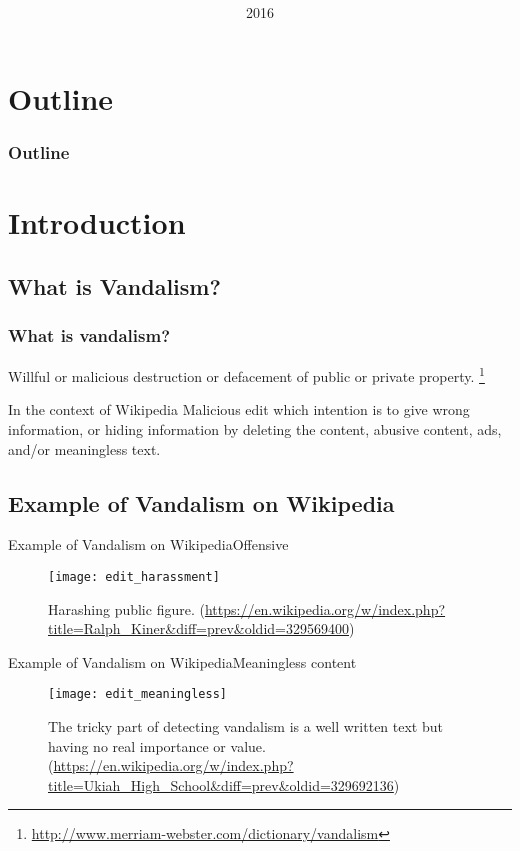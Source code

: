 \documentclass{beamer}
\title[Detecting Vandalism with CRF]{%
	\mytitle
}
\author{\myname}
\institute[STEI-ITB]{%
	\mydept\\
	\itb
}
\date{2016}
\begin{document}
\frame{\titlepage}

\section*{Outline}
\begin{frame}
	\frametitle{Outline}
	\begin{multicols}{2}
		\tableofcontents
	\end{multicols}
\end{frame}

\section{Introduction}

\subsection{What is Vandalism?}
\begin{frame}
	\frametitle{What is vandalism?}
	\begin{definition}
		Willful or malicious destruction or defacement of public or private
		property.
		\footnote{\url{http://www.merriam-webster.com/dictionary/vandalism}}
	\end{definition}
	\pause
	\begin{block}{In the context of Wikipedia}
		Malicious edit which intention is to give wrong information, or hiding
		information by deleting the content, abusive content, ads, and/or
		meaningless text.
	\end{block}
\end{frame}

\subsection{Example of Vandalism on Wikipedia}
\begin{frame}{Example of Vandalism on Wikipedia}{Offensive}
	\begin{figure}
		\centering
		\texttt{[image: edit\_harassment]}
		\caption{
			Harashing public figure.
			(\url{https://en.wikipedia.org/w/index.php?title=Ralph_Kiner&diff=prev&oldid=329569400})
		}
	\end{figure}
\end{frame}

\begin{frame}{Example of Vandalism on Wikipedia}{Meaningless content}
	\begin{figure}
		\centering
		\texttt{[image: edit\_meaningless]}
		\caption{
			The tricky part of detecting vandalism is a well written text but
			having no real importance or value.
			(\url{https://en.wikipedia.org/w/index.php?title=Ukiah_High_School&diff=prev&oldid=329692136})
		}
	\end{figure}
\end{frame}
\end{document}
